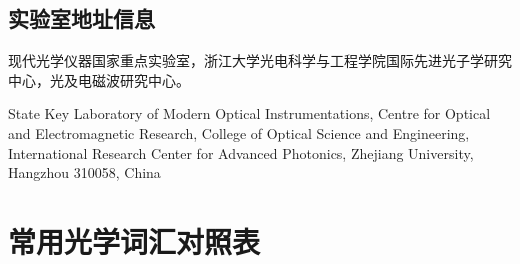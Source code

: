 \documentclass[cn,11pt,chinese]{elegantbook}
\begin{document}
\section{实验室地址信息}
现代光学仪器国家重点实验室，浙江大学光电科学与工程学院国际先进光子学研究中心，光及电磁波研究中心。

State Key Laboratory of Modern Optical Instrumentations, Centre for Optical and
Electromagnetic Research, College of Optical Science and Engineering, International
Research Center for Advanced Photonics, Zhejiang University, Hangzhou 310058, China

\chapter{常用光学词汇对照表}

\end{document}
